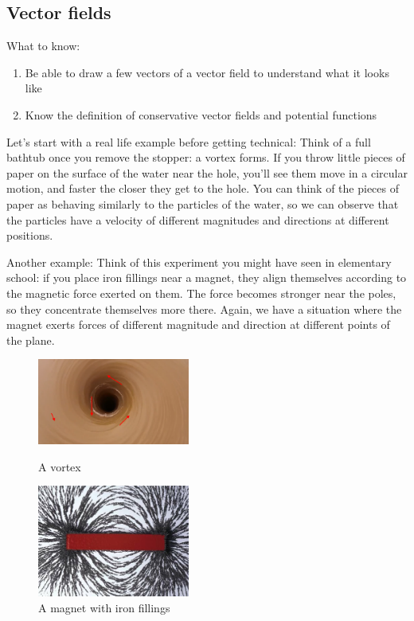\documentclass[12pt]{article}
\title{}
\begin{document}
\subsection*{Vector fields}
What to know:
\begin{enumerate}
\item Be able to draw a few vectors of a vector field to understand what it looks like
\item Know the definition of conservative vector fields and potential functions
\end{enumerate}

Let's start with a real life example before getting technical: Think of a full bathtub once you remove the stopper: a vortex forms. If you throw little pieces of paper on the surface of the water near the hole, you'll see them move in a circular motion, and faster the closer they get to the hole. You can think of the pieces of paper as behaving similarly to the particles of the water, so we can observe that the particles have a velocity of different magnitudes and directions at different positions.

Another example: Think of this experiment you might have seen in elementary school: if you place iron fillings near a magnet, they align themselves according to the magnetic force exerted on them. The force becomes stronger near the poles, so they concentrate themselves more there. Again, we have a situation where the magnet exerts forces of different magnitude and direction at different points of the plane.

\begin{figure}[h]
\centering
\parbox{5cm}{
\includegraphics[width=5cm]{vortex.png}
\caption{A vortex}
\label{}}
\qquad
\begin{minipage}{5cm}
\includegraphics[width=5cm]{magnet.jpeg}
\caption{A magnet with iron fillings}
\label{fig:2figsB}
\end{minipage}
\end{figure}
\end{document}
